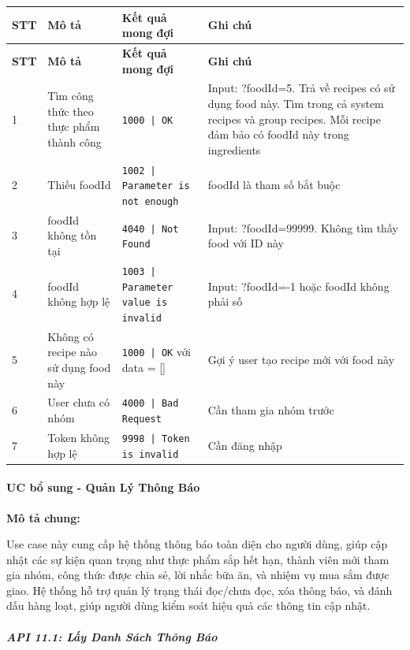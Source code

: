 \begin{longtable}{|p{}|p{}|p{}|p{}|}
\hline
\textbf{STT} & \textbf{Mô tả} & \textbf{Kết quả mong đợi} & \textbf{Ghi chú} \\
\hline
\endfirsthead

\hline
\textbf{STT} & \textbf{Mô tả} & \textbf{Kết quả mong đợi} & \textbf{Ghi chú} \\
\hline
\endhead

\hline
\endfoot

1 & Tìm công thức theo thực phẩm thành công & \texttt{1000 | OK} & Input: ?foodId=5. Trả về recipes có sử dụng food này. Tìm trong cả system recipes và group recipes. Mỗi recipe đảm bảo có foodId này trong ingredients \\
\hline
2 & Thiếu foodId & \texttt{1002 | Parameter is not enough} & foodId là tham số bắt buộc \\
\hline
3 & foodId không tồn tại & \texttt{4040 | Not Found} & Input: ?foodId=99999. Không tìm thấy food với ID này \\
\hline
4 & foodId không hợp lệ & \texttt{1003 | Parameter value is invalid} & Input: ?foodId=-1 hoặc foodId không phải số \\
\hline
5 & Không có recipe nào sử dụng food này & \texttt{1000 | OK} với data = [] & Gợi ý user tạo recipe mới với food này \\
\hline
6 & User chưa có nhóm & \texttt{4000 | Bad Request} & Cần tham gia nhóm trước \\
\hline
7 & Token không hợp lệ & \texttt{9998 | Token is invalid} & Cần đăng nhập \\
\hline
\end{longtable}
\paragraph{UC bổ sung - Quản Lý Thông Báo}

\textbf{Mô tả chung:}

Use case này cung cấp hệ thống thông báo toàn diện cho người dùng, giúp cập nhật các sự kiện quan trọng như thực phẩm sắp hết hạn, thành viên mới tham gia nhóm, công thức được chia sẻ, lời nhắc bữa ăn, và nhiệm vụ mua sắm được giao. Hệ thống hỗ trợ quản lý trạng thái đọc/chưa đọc, xóa thông báo, và đánh dấu hàng loạt, giúp người dùng kiểm soát hiệu quả các thông tin cập nhật.

\subparagraph{API 11.1: Lấy Danh Sách Thông Báo}~\\

